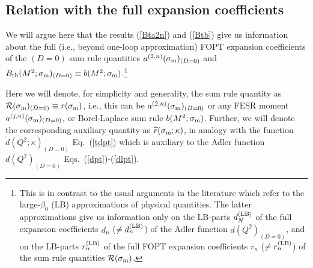 \documentclass[aps,nofootinbib,showkeys,noshowpacs,preprintnumbers,amsmath,amssymb]{revtex4}
\newcommand{\sm}{{\sigma_{\rm m}}}
\newcommand{\td}{{\widetilde d}}
\newcommand{\tr}{{\widetilde r}}
\begin{document}
\subsection{Relation with the full expansion coefficients}
\label{app:coeffs}

We will argue here that the results (\ref{Bta2n}) and (\ref{Btb}) give us information about the full (i.e., beyond one-loop approximation) FOPT expansion coefficients of the $(D=0)$ sum rule quantities $a^{(2,n)}(\sm)_{(D=0)}$ and $B_{\rm th}(M^2; \sm)_{(D=0)} \equiv  b(M^2;\sm)$.\footnote{
This is in contrast to the usual arguments in the literature which refer to the large-$\beta_0$ (LB) approximations of physical quantities. The latter approximations give us information only on the LB-parts $d_N^{\rm (LB)}$ of the full expansion coefficients $d_n$ ($\not= d_n^{\rm (LB)}$) of the Adler function $d(Q^2)_{(D=0)}$, and on the LB-parts $r_n^{\rm (LB)}$ of the full FOPT expansion coefficients $r_n$  ($\not= r_n^{\rm (LB)}$) of the sum rule quantities ${\cal R}(\sm)$.}

Here we will denote, for simplicity and generality, the sum rule quantity as ${\cal R}(\sm)_{(D=0)} \equiv r(\sm)$, i.e., this can be $a^{(2,n)}(\sm)_{(D=0)}$ or any FESR moment $a^{(j,n)}(\sm)_{(D=0)}$, or Borel-Laplace sum rule $b(M^2;\sm)$. Further, we will denote the corresponding auxiliary quantity as $\tr(\sm; \kappa)$, in analogy with the function $\td(Q^2;\kappa)_{(D=0)}$ Eq.~(\ref{tdpt}) which is auxiliary to the Adler function $d(Q^2)_{(D=0)}$ Eqs.~(\ref{dpt})-(\ref{dlpt}).
\end{document}
